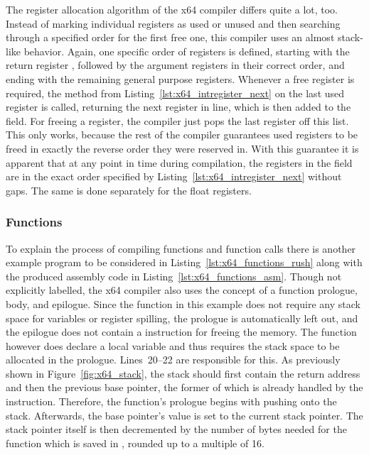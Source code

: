 
The register allocation algorithm of the x64 compiler differs quite a lot, too.
Instead of marking individual registers as used or unused and then searching through a specified order for the first free one, this compiler uses an almost stack-like behavior.
Again, one specific order of registers is defined, starting with the return register , followed by the argument registers in their correct order, and ending with the remaining general purpose registers.
Whenever a free register is required, the  method from Listing~\ref{lst:x64_intregister_next} on the last used register is called, returning the next register in line, which is then added to the  field.
For freeing a register, the compiler just pops the last register off this list.
This only works, because the rest of the compiler guarantees used registers to be freed in exactly the reverse order they were reserved in.
With this guarantee it is apparent that at any point in time during compilation, the registers in the  field are in the exact order specified by Listing~\ref{lst:x64_intregister_next} without gaps.
The same is done separately for the float registers.

\subsubsection{Functions}


To explain the process of compiling functions and function calls there is another example program to be considered in Listing~\ref{lst:x64_functions_rush} along with the produced assembly code in Listing~\ref{lst:x64_functions_asm}.
Though not explicitly labelled, the x64 compiler also uses the concept of a function prologue, body, and epilogue.
Since the  function in this example does not require any stack space for variables or register spilling, the prologue is automatically left out, and the epilogue does not contain a  instruction for freeing the memory.
The  function however does declare a local variable and thus requires the stack space to be allocated in the prologue.
Lines~20--22 are responsible for this.
As previously shown in Figure~\ref{fig:x64_stack}, the stack should first contain the return address and then the previous base pointer, the former of which is already handled by the  instruction.
Therefore, the function's prologue begins with pushing  onto the stack.
Afterwards, the base pointer's value is set to the current stack pointer.
The stack pointer itself is then decremented by the number of bytes needed for the function which is saved in , rounded up to a multiple of 16.


